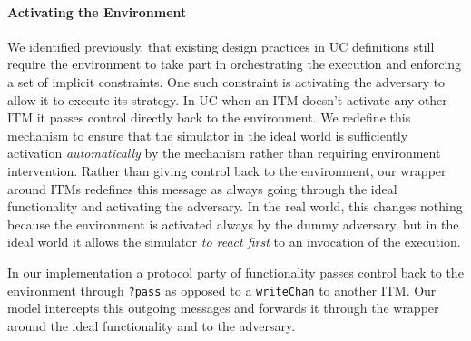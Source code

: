 \paragraph{Activating the Environment}
We identified previously, that existing design practices in UC definitions still require the environment to take part in orchestrating the execution and enforcing a set of implicit constraints.
One such constraint is activating the adversary to allow it to execute its strategy.
In UC when an ITM doesn't activate any other ITM it passes control directly back to the environment.
We redefine this mechanism to ensure that the simulator in the ideal world is sufficiently activation \emph{automatically} by the mechanism rather than requiring environment intervention.
Rather than giving control back to the environment, our wrapper around ITMs redefines this message as always going through the ideal functionality and activating the adversary.
In the real world, this changes nothing because the environment is activated always by the dummy adversary, but in the ideal world it allows the simulator \emph{to react first} to an invocation of the execution. 

In our implementation a protocol party of functionality passes control back to the environment through \texttt{?pass} as opposed to a \texttt{writeChan} to another ITM.
Our model intercepts this outgoing messages and forwards it through the wrapper around the ideal functionality and to the adversary.


